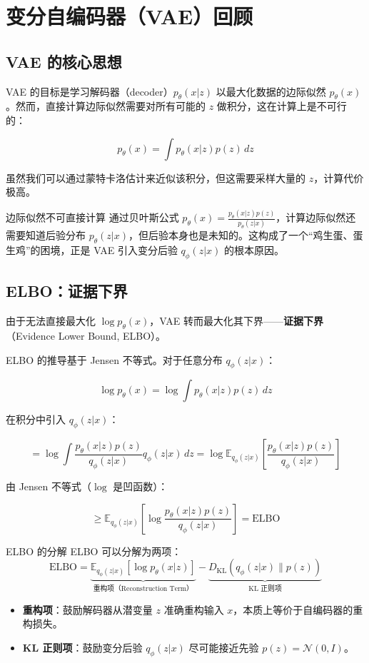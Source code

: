 \section{变分自编码器（VAE）回顾}

\subsection{VAE 的核心思想}

VAE 的目标是学习解码器（decoder）$p_\theta(x|z)$ 以最大化数据的边际似然 $p_\theta(x)$。然而，直接计算边际似然需要对所有可能的 $z$ 做积分，这在计算上是不可行的：

$$p_\theta(x) = \int p_\theta(x|z) p(z) \, dz$$

虽然我们可以通过蒙特卡洛估计来近似该积分，但这需要采样大量的 $z$，计算代价极高。

\begin{warningbox}{边际似然不可直接计算}
通过贝叶斯公式 $p_\theta(x) = \frac{p_\theta(x|z) p(z)}{p_\theta(z|x)}$，计算边际似然还需要知道后验分布 $p_\theta(z|x)$，但后验本身也是未知的。这构成了一个``鸡生蛋、蛋生鸡''的困境，正是 VAE 引入变分后验 $q_\phi(z|x)$ 的根本原因。
\end{warningbox}

\subsection{ELBO：证据下界}

由于无法直接最大化 $\log p_\theta(x)$，VAE 转而最大化其下界——\textbf{证据下界}（Evidence Lower Bound, ELBO）。

ELBO 的推导基于 Jensen 不等式。对于任意分布 $q_\phi(z|x)$：

$$\log p_\theta(x) = \log \int p_\theta(x|z) p(z) \, dz$$

在积分中引入 $q_\phi(z|x)$：

$$= \log \int \frac{p_\theta(x|z) p(z)}{q_\phi(z|x)} q_\phi(z|x) \, dz = \log \mathbb{E}_{q_\phi(z|x)} \left[ \frac{p_\theta(x|z) p(z)}{q_\phi(z|x)} \right]$$

由 Jensen 不等式（$\log$ 是凹函数）：

$$\geq \mathbb{E}_{q_\phi(z|x)} \left[ \log \frac{p_\theta(x|z) p(z)}{q_\phi(z|x)} \right] = \text{ELBO}$$

\begin{importantbox}{ELBO 的分解}
ELBO 可以分解为两项：
$$\text{ELBO} = \underbrace{\mathbb{E}_{q_\phi(z|x)}[\log p_\theta(x|z)]}_{\text{重构项（Reconstruction Term）}} - \underbrace{D_{\text{KL}}(q_\phi(z|x) \| p(z))}_{\text{KL 正则项}}$$

\begin{itemize}
    \item \textbf{重构项}：鼓励解码器从潜变量 $z$ 准确重构输入 $x$，本质上等价于自编码器的重构损失。
    \item \textbf{KL 正则项}：鼓励变分后验 $q_\phi(z|x)$ 尽可能接近先验 $p(z) = \mathcal{N}(0, I)$。
\end{itemize}
\end{importantbox}

